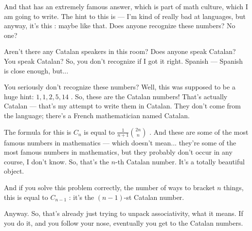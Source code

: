 \begin{speech}[00:53:41 - 00:55:19]
And that has an extremely famous answer, which is part of math culture, which I am going to write. The hint to this is --- I'm kind of really bad at languages, but anyway, it's this : maybe like that. Does anyone recognize these numbers? No one?

Aren't there any Catalan speakers in this room? Does anyone speak Catalan? You speak Catalan?  So, you don't recognize if I got it right.  Spanish --- Spanish is close enough, but...

You seriously don't recognize these numbers? Well, this was supposed to be a huge hint: $1, 1, 2, 5, 14$ . So, these are the Catalan numbers! That's actually Catalan --- that's my attempt to write them in Catalan. They don't come from the language; there's a French mathematician named Catalan.

The formula for this is $C_n$ is equal to $\frac{1}{n+1} \binom{2n}{n}$ . And these are some of the most famous numbers in mathematics --- which doesn't mean... they're some of the most famous numbers in mathematics, but they probably don't occur in any course, I don't know. So, that's the $n$-th Catalan number. It's a totally beautiful object.

And if you solve this problem correctly, the number of ways to bracket $n$ things, this is equal to $C_{n-1}$ : it's the $(n-1)$-st Catalan number.

Anyway. So, that's already just trying to unpack associativity, what it means. If you do it, and you follow your nose, eventually you get to the Catalan numbers.
\end{speech}

